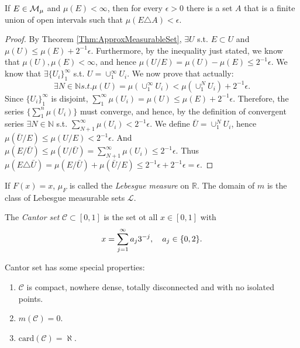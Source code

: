 \begin{exc}
    If $E\in\mathcal{M}_{\mu}$ and $\mu(E)<\infty$, then for every 
    $\epsilon>0$ there is a set $A$ that is a finite union of open 
    intervals such that $\mu(E\triangle A)<\epsilon$.
\end{exc}
\begin{proof}
    By Theorem \ref{Thm:ApproxMeasurableSet}, $\exists U$ s.t. $E\subset U$
    and $\mu(U)\leq\mu(E)+2^{-1}\epsilon$. Furthermore, by the
    inequality just stated, we know that $\mu(U),\mu(E)<\infty$, and hence 
    $\mu(U/E)=\mu(U)-\mu(E)\leq 2^{-1}\epsilon$. We know that $\exists \{U_i\}_1^{\infty}$
    s.t. $U=\cup_1^{\infty}U_i$. We now prove that actually:
    \begin{displaymath}
        \exists N\in\mathbb{N}\textit{s.t.}\mu(U)=\mu(\cup_1^{\infty}U_i)
        <\mu(\cup_1^{N}U_i)+2^{-1}\epsilon.
    \end{displaymath}
    Since $\{U_i\}_1^{\infty}$ is disjoint, $\sum_1^{\infty}\mu(U_i)=\mu(U)
    \leq\mu(E)+2^{-1}\epsilon$. Therefore, the series $\{\sum_1^{n}\mu(U_i)\}$
    must converge, and hence, by the definition of convergent series $\exists
    N\in\mathbb{N}$ s.t. $\sum_{N+1}^{\infty}\mu(U_i)<2^{-1}\epsilon$. We define
    $\bar{U}=\cup_1^{N}U_i$, hence $\mu(\bar{U}/E)\leq\mu(U/E)<2^{-1}\epsilon$. 
    And $\mu(E/\bar{U})\leq\mu(U/\bar{U})=\sum_{N+1}^{\infty}\mu(U_i)\leq2^{-1}\epsilon$.
    Thus $\mu(E\triangle\bar{U})=\mu(E/\bar{U})+\mu(\bar{U}/E)\leq2^{-1}\epsilon+2^{-1}\epsilon=\epsilon$.
\end{proof}
\begin{defn}
    If $F(x)=x$, $\mu_{F}$ is called the \textit{Lebesgue measure }on 
    $\mathbb{R}$. The domain of $m$ is the class of Lebesgue 
    measurable sets $\mathcal{L}$.
\end{defn}
\begin{defn}
    The \textit{Cantor set }$\mathcal{C}\subset[0,1]$ is the 
    set ot all $x\in[0,1]$ with 
    \begin{displaymath}
        x=\sum_{j=1}^{\infty}a_j3^{-j},\quad a_j\in\{0,2\}.
    \end{displaymath}
\end{defn}
\begin{prop}
    \label{Prop:PropertiesOfCantorSet}
    Cantor set has some special properties:
    \begin{enumerate}
        \item $\mathcal{C}$ is compact, nowhere dense, 
        totally disconnected and with no isolated points.
        \item $m(\mathcal{C})=0$.
        \item $\text{card}(\mathcal{C})=\aleph$.
    \end{enumerate}
\end{prop}
